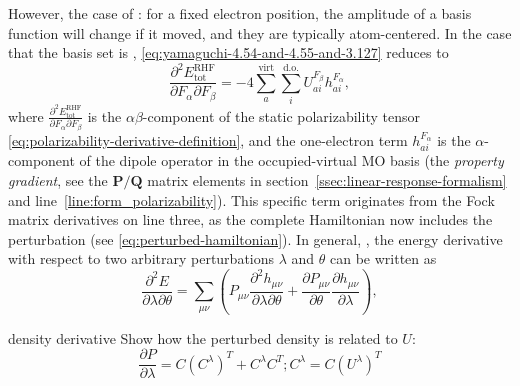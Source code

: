 \documentclass[%
class = book,%
crop = false,%
float = true,%
multi = true,%
preview = false,%
]{standalone}
\begin{document}
However, the case of : for a fixed electron position, the amplitude of a basis function will change if it moved, and they are typically atom-centered. In the case that the basis set is  , \eqref{eq:yamaguchi-4.54-and-4.55-and-3.127} reduces to
\begin{equation}
  \label{eq:yamaguchi-17.54} \tag{Yamaguchi eq. 17.54}
  \frac{\partial^{2} E_{\text{tot}}^{\text{RHF}}}{\partial F_{\alpha} \partial F_{\beta}} = -4 \sum_{a}^{\text{virt}} \sum_{i}^{\text{d.o.}} U_{ai}^{F_{\beta}} h_{ai}^{F_{\alpha}},
\end{equation}
where \(\frac{\partial^{2} E_{\text{tot}}^{\text{RHF}}}{\partial F_{\alpha} \partial F_{\beta}}\) is the \(\alpha\beta\)-component of the static polarizability tensor \eqref{eq:polarizability-derivative-definition}, and the one-electron term \(h_{ai}^{F_{\alpha}}\) is the \(\alpha\)-component of the dipole operator in the occupied-virtual MO basis (the \emph{property gradient}, see the \(\mathbf{P}/\mathbf{Q}\) matrix elements in section~\ref{ssec:linear-response-formalism} and line~\ref{line:form_polarizability}). This specific term originates from the Fock matrix derivatives on line three, as the complete Hamiltonian now includes the perturbation (see \eqref{eq:perturbed-hamiltonian}). In general, , the energy derivative with respect to two arbitrary perturbations \(\lambda\) and \(\theta\) can be written as
\begin{equation}
  \label{eq:neese-77} \tag{Neese eq. 77}
  \frac{\partial^{2} E}{\partial \lambda \partial \theta} = \sum_{\mu\nu} \left( P_{\mu\nu} \frac{\partial^{2} h_{\mu\nu}}{\partial \lambda \partial \theta} + \frac{\partial P_{\mu\nu}}{\partial \theta} \frac{\partial h_{\mu\nu}}{\partial \lambda} \right),
\end{equation}
\begin{anfxnote}{density derivative}
  Show how the perturbed density is related to \(U\):
  \begin{equation}
    \frac{\partial P}{\partial \lambda} = C (C^{\lambda})^{T} + C^{\lambda} C^{T}; C^{\lambda} = C (U^{\lambda})^{T}
  \end{equation}
\end{anfxnote}
\end{document}
